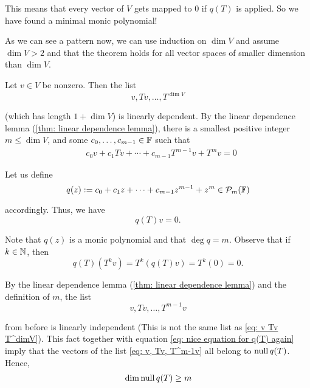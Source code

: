 \begin{prf}
  This means that every vector of $V$ gets mapped to $0$ if $q(T)$ is applied. So we have found a minimal monic polynomial!

   As we can see a pattern now, we can use induction on $\dim V$ and assume $\dim V > 2$ and that the theorem holds for all vector spaces of smaller dimension than $\dim V$.

  Let $v\in V$ be nonzero. Then the list
  \begin{equation}
    \label{eq: v Tv T^dimV}
    v, Tv, \dots, T^{\dim V}
  \end{equation}

  (which has length $1+\dim V$) is linearly dependent.
  By the linear dependence lemma (\ref{thm: linear dependence lemma}), there is a smallest positive integer $m\leq \dim V$,  and some $c_0, \ldots, c_{m-1} \in \mathbb{F}$ such that
  \begin{equation}
    \begin{aligned}
      &c_0 v + c_1 Tv + \cdots + c_{m-1} T^{m-1} v + T^m v = 0
    \end{aligned}
  \end{equation}

  Let us define
  \begin{equation}
    q(z) := c_0 + c_1z + \cdots + c_{m-1} z^{m-1} +z^{m} \in \mathcal{P}_m (\mathbb{F})
  \end{equation}

  accordingly. Thus, we have
  \begin{equation}
    q(T) v=0.
  \end{equation}

  Note that $q(z)$ is a monic polynomial and that $\deg q = m$. Observe that if $k \in \mathbb{N}$, then
  \begin{equation}
    \label{eq: nice equation for q(T) again}
    q(T)(T^kv)=T^k(q(T)v) =T^k (0) =0.
  \end{equation}

  By the linear dependence lemma (\ref{thm: linear dependence lemma}) and the definition of $m$, the list
  \begin{equation}
    \label{eq: v, Tv, T^m-1v}
    v, Tv, \dots, T^{m-1}v
  \end{equation}

  from before is linearly independent (This is not the same list as \eqref{eq: v Tv T^dimV}). This fact together with equation \eqref{eq: nice equation for q(T) again} imply that the vectors of the list \eqref{eq: v, Tv, T^m-1v} all belong to $\operatorname{null} q(T)$. Hence,
  \begin{equation}
    \begin{aligned}
      &\dim \operatorname{null} q(T)   \geq m \\
    \end{aligned}
  \end{equation}


\end{prf}
